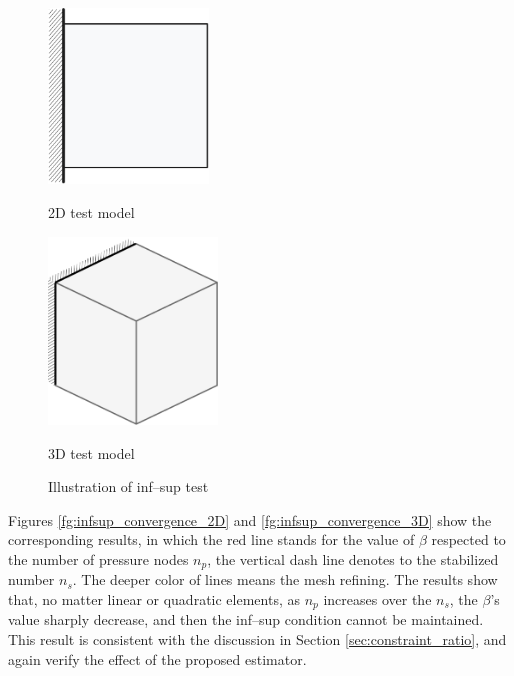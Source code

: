 \begin{figure}[H]
\centering
\begin{subcaptiongroup}
\parbox[b]{0.4\textwidth}{
\includegraphics[width=0.38\textwidth]{png/infsup_model.png}\caption{2D test model}\label{infsup_convergence_2D}
}
\hspace{20pt}
\parbox[b]{0.4\textwidth}{
\includegraphics[width=0.4\textwidth]{png/inf_sup_block.png}\caption{3D test model}\label{infsup_convergence_3D}
}
\end{subcaptiongroup}
\caption{Illustration of inf--sup test}\label{fg:inf_sup_test}
\end{figure}

Figures \ref{fg:infsup_convergence_2D} and \ref{fg:infsup_convergence_3D} show the corresponding results, in which the red line stands for the value of $\beta$ respected to the number of pressure nodes $n_p$, the vertical dash line denotes to the stabilized number $n_s$.
The deeper color of lines means the mesh refining.
The results show that,
no matter linear or quadratic elements, as $n_p$ increases over the $n_s$, the $\beta$'s value sharply decrease, and then the inf--sup condition cannot be maintained.
This result is consistent with the discussion in Section \ref{sec:constraint_ratio},
and again verify the effect of the proposed estimator.

